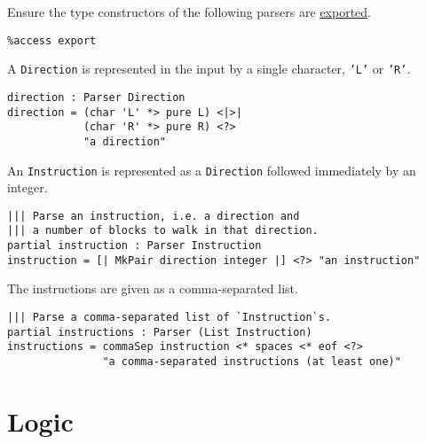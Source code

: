 \documentclass[b5paper,twoside]{amsbook}
\begin{document}
Ensure the type constructors of the following parsers are
\href{http://docs.idris-lang.org/en/latest/tutorial/modules.html\#meaning-for-data-types}{exported}.

\begin{verbatim}
%access export
\end{verbatim}

A \texttt{Direction} is represented in the input by a
single character, \texttt{'L'} or
\texttt{'R'}.

\begin{verbatim}
direction : Parser Direction
direction = (char 'L' *> pure L) <|>|
            (char 'R' *> pure R) <?>
            "a direction"
\end{verbatim}

An \texttt{Instruction} is represented as a
\texttt{Direction} followed immediately by an integer.

\begin{verbatim}
||| Parse an instruction, i.e. a direction and
||| a number of blocks to walk in that direction.
partial instruction : Parser Instruction
instruction = [| MkPair direction integer |] <?> "an instruction"
\end{verbatim}

The instructions are given as a comma-separated list.

\begin{verbatim}
||| Parse a comma-separated list of `Instruction`s.
partial instructions : Parser (List Instruction)
instructions = commaSep instruction <* spaces <* eof <?>
               "a comma-separated instructions (at least one)"
\end{verbatim}

\newpage

\section{Logic}\label{logic}
\end{document}
